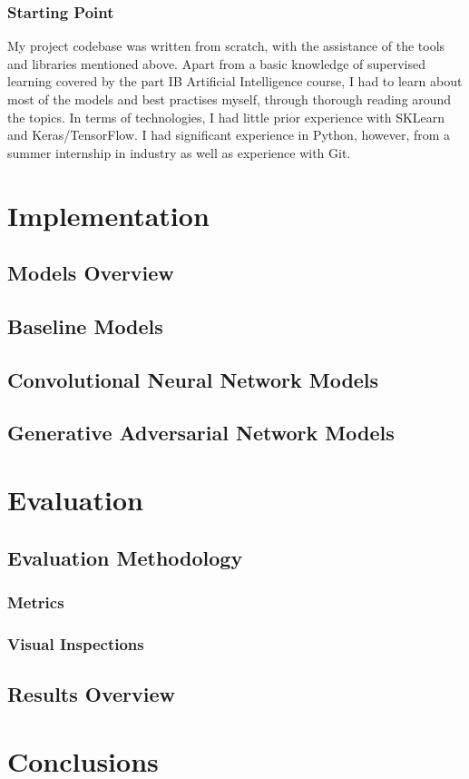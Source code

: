 \documentclass[12pt,a4paper,twoside]{report}
\begin{document}
\subsection{Starting Point}

My project codebase was written from scratch, with the assistance of the tools and libraries mentioned above. Apart from a basic knowledge of supervised learning covered by the part IB Artificial Intelligence course, I had to learn about most of the models and best practises myself, through thorough reading around the topics. 
In terms of technologies, I had little prior experience with SKLearn and Keras/TensorFlow. I had significant experience in Python, however, from a summer internship in industry as well as experience with Git.


\chapter{Implementation}
\section{Models Overview}
\section{Baseline Models}
\section{Convolutional Neural Network Models}
\section{Generative Adversarial Network Models}

\chapter{Evaluation}
\section{Evaluation Methodology}
\subsection{Metrics}
\subsection{Visual Inspections}

\section{Results Overview}

\chapter{Conclusions}

\newpage
{}



\end{document}
